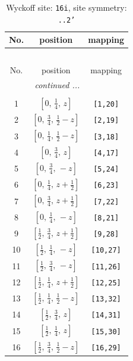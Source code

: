 \documentclass[fleqn,8pt]{jsarticle}
\begin{document}
\renewcommand{\arraystretch}{1.2}
\begin{longtable}{ccc}
\caption{Wyckoff site: {\tt 16i}, site symmetry: {\tt ..2'}}
 \\
 \hline \hline
No. & position & mapping \\ \hline \endfirsthead

\multicolumn{2}{l}{\tablename\ \thetable{}} \\
 \hline \hline
No. & position & mapping \\ \hline \endhead

 \hline \hline
\multicolumn{2}{r}{\footnotesize\it continued ...} \\ \endfoot

 \hline \hline
\multicolumn{2}{r}{} \\ \endlastfoot

1 & $\left[ 0,\, \frac{1}{4},\, z \right]$ & {\tt [1,20]} \\ \hline
2 & $\left[ 0,\, \frac{3}{4},\, \frac{1}{2} - z \right]$ & {\tt [2,19]} \\ \hline
3 & $\left[ 0,\, \frac{1}{4},\, \frac{1}{2} - z \right]$ & {\tt [3,18]} \\ \hline
4 & $\left[ 0,\, \frac{3}{4},\, z \right]$ & {\tt [4,17]} \\ \hline
5 & $\left[ 0,\, \frac{3}{4},\, - z \right]$ & {\tt [5,24]} \\ \hline
6 & $\left[ 0,\, \frac{1}{4},\, z + \frac{1}{2} \right]$ & {\tt [6,23]} \\ \hline
7 & $\left[ 0,\, \frac{3}{4},\, z + \frac{1}{2} \right]$ & {\tt [7,22]} \\ \hline
8 & $\left[ 0,\, \frac{1}{4},\, - z \right]$ & {\tt [8,21]} \\ \hline
9 & $\left[ \frac{1}{2},\, \frac{3}{4},\, z + \frac{1}{2} \right]$ & {\tt [9,28]} \\ \hline
10 & $\left[ \frac{1}{2},\, \frac{1}{4},\, - z \right]$ & {\tt [10,27]} \\ \hline
11 & $\left[ \frac{1}{2},\, \frac{3}{4},\, - z \right]$ & {\tt [11,26]} \\ \hline
12 & $\left[ \frac{1}{2},\, \frac{1}{4},\, z + \frac{1}{2} \right]$ & {\tt [12,25]} \\ \hline
13 & $\left[ \frac{1}{2},\, \frac{1}{4},\, \frac{1}{2} - z \right]$ & {\tt [13,32]} \\ \hline
14 & $\left[ \frac{1}{2},\, \frac{3}{4},\, z \right]$ & {\tt [14,31]} \\ \hline
15 & $\left[ \frac{1}{2},\, \frac{1}{4},\, z \right]$ & {\tt [15,30]} \\ \hline
16 & $\left[ \frac{1}{2},\, \frac{3}{4},\, \frac{1}{2} - z \right]$ & {\tt [16,29]} \\
\end{longtable}
\end{document}

